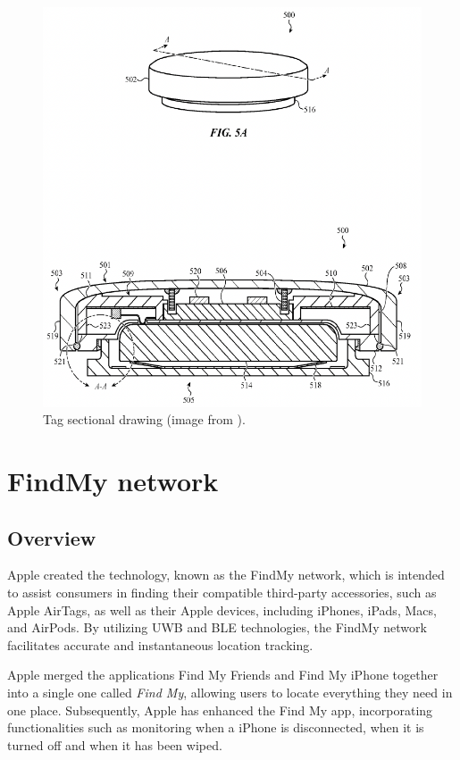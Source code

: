 \documentclass[english]{article}
\begin{document}
\begin{figure}[]
	\centering
	\includegraphics[width=\textwidth]{images/br1 s2.png}
	\caption{Tag sectional drawing (image from \cite{Perkins_Sano_Walton_Wang_Werner_Ashcroft_De_Hunter_Kim_Crosby_Jung_Schaevitz_Avendal_Da_Di_Nath_Papantonis_Graham_Thompson_Copeland_Ely_2022}). }
	\label{img:br2}
\end{figure}


\section{FindMy network}\label{sec:find}
\subsection{Overview}
Apple created the technology, known as the FindMy network, which is intended to assist consumers in finding their compatible third-party accessories, such as Apple AirTags, as well as their Apple devices, including iPhones, iPads, Macs, and AirPods. By utilizing UWB and BLE technologies, the FindMy network facilitates accurate and instantaneous location tracking.

Apple merged the applications Find My Friends and Find My iPhone together into a single one called \textit{Find My}, allowing users to locate everything they need in one place. Subsequently, Apple has enhanced the Find My app, incorporating functionalities such as monitoring when a iPhone is disconnected, when it is turned off and when it has been wiped.
\end{document}
